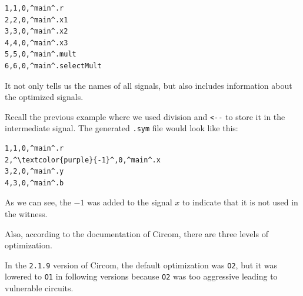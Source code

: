 \documentclass[../lecture-notes-148x210.tex]{subfiles}
\begin{document}
\begin{center}
    \begin{tcolorbox}[enhanced,
        width=0.5\textwidth,
        title=\textbf{.sym file for $x_1? \; x_2 \times x_3: x_2+x_3$},
        coltitle=gray!25!black,
        attach boxed title to top center={yshift=-2mm,yshifttext=-1mm},
        boxed title style={size=small,colframe=gray!75!black,
        colback=blue!30!white,boxrule=1pt},
        top=-0.35cm,
        bottom=-0.35cm]
        \begin{lstlisting}[language=Circom,numbers=none,basicstyle=\ttfamily\footnotesize,escapechar=^]
1,1,0,^main^.r
2,2,0,^main^.x1
3,3,0,^main^.x2
4,4,0,^main^.x3
5,5,0,^main^.mult
6,6,0,^main^.selectMult
        \end{lstlisting}
    \end{tcolorbox}
\end{center}

It not only tells us the names of all signals, but also includes information about the optimized signals.

Recall the previous example where we used division and \texttt{<-{-}} to store it in the intermediate signal.
The generated \texttt{.sym} file would look like this:

\begin{center}
    \begin{tcolorbox}[enhanced,
        width=0.5\textwidth,
        title=\textbf{.sym file for $b \;\texttt{<-{-}}\; x/y, r \;\texttt{<==}\; by$},
        coltitle=gray!25!black,
        attach boxed title to top center={yshift=-2mm,yshifttext=-1mm},
        boxed title style={size=small,colframe=gray!75!black,
        colback=blue!30!white,boxrule=1pt},
        top=-0.35cm,
        bottom=-0.35cm]
        \begin{lstlisting}[language=Circom,numbers=none,basicstyle=\ttfamily\footnotesize,escapechar=^]
1,1,0,^main^.r
2,^\textcolor{purple}{-1}^,0,^main^.x
3,2,0,^main^.y
4,3,0,^main^.b
        \end{lstlisting}
    \end{tcolorbox}
\end{center}

As we can see, the $-1$ was added to the signal $x$ to indicate that it is not used in the witness.

Also, according to the documentation of Circom, there are three levels of optimization.

In the \texttt{2.1.9} version of Circom, the default optimization was \texttt{O2}, but it was lowered to \texttt{O1} in following versions because \texttt{O2} was too aggressive leading to vulnerable circuits.
\end{document}
